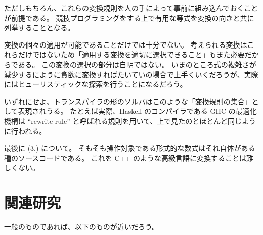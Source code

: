 \documentclass{ltjsarticle}
\begin{document}
ただしもちろん、これらの変換規則を人の手によって事前に組み込んでおくことが前提である。
競技プログラミングをする上で有用な等式を変換の向きと共に列挙することとなる。

変換の個々の適用が可能であることだけでは十分でない。
考えられる変換はこれらだけではないため「適用する変換を適切に選択できること」もまた必要だからである。
この変換の選択の部分は自明ではない。
いまのところ式の複雑さが減少するにように貪欲に変換すればたいていの場合で上手くいくだろうが、実際にはヒューリスティックな探索を行うことになるだろう。

いずれにせよ、トランスパイラの形のソルバはこのような「変換規則の集合」として表現されうる。
たとえば実際、Haskell のコンパイラである GHC の最適化機構は ``rewrite rule'' と呼ばれる規則を用いて、上で見たのとほとんど同じように行われる。

最後に (3.) について。
そもそも操作対象である形式的な数式はそれ自体がある種のソースコードである。
これを C++ のような高級言語に変換することは難しくない。





\section{関連研究}

一般のものであれば、以下のものが近いだろう。
\end{document}
